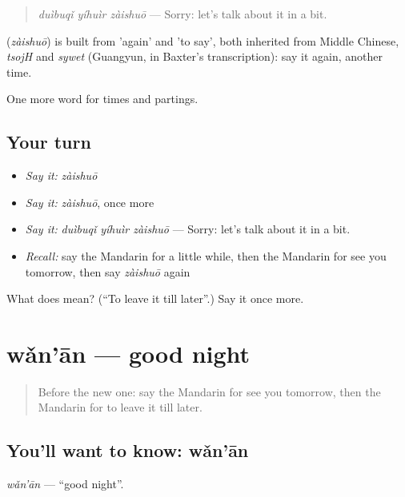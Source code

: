 \begin{quote}
\textbf{} \emph{duìbuqǐ yíhuìr zàishuō} — Sorry: let's talk about it in a bit.
\end{quote}

\begin{cousinweb}
\textbf{} (\emph{zàishuō}) is built from  'again' and  'to say', both inherited from Middle Chinese, \emph{tsojH} and \emph{sywet} (Guangyun, in Baxter's transcription): say it again, another time.
\end{cousinweb}

\begin{grammarlens}[title={What you've built}]
One more word for times and partings.
\end{grammarlens}

\subsection*{Your turn}
\begin{itemize}
\raggedright
  \item \emph{Say it:} \emph{zàishuō}
  \item \emph{Say it:} \emph{zàishuō}, once more
  \item \emph{Say it:} \emph{duìbuqǐ yíhuìr zàishuō} — Sorry: let's talk about it in a bit.
  \item \emph{Recall:} say the Mandarin for a little while, then the Mandarin for see you tomorrow, then say \emph{zàishuō} again
\end{itemize}

\begin{tcolorbox}[breakable,colback=teal!4,colframe=teal!35!black,title={Before you move on}]
What does  mean? (\textquotedblleft{}To leave it till later\textquotedblright{}.) Say it once more.
\end{tcolorbox}
\section[wǎn'ān]{wǎn'ān — good night}

\label{lesson:ZH-C76-wanan}



\begin{quote}
Before the new one: say the Mandarin for see you tomorrow, then the Mandarin for to leave it till later.
\end{quote}

\subsection*{You'll want to know: wǎn'ān}
\emph{wǎn'ān} — \textquotedblleft{}good night\textquotedblright{}.

